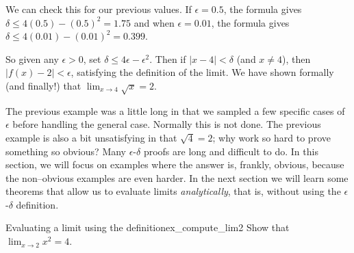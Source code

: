 \begin{solution}
{We can check this for our previous values.  If $\epsilon=0.5$, the formula gives
$\delta \leq 4(0.5) - (0.5)^2 = 1.75$ and when $\epsilon=0.01$, the formula gives $\delta \leq 4(0.01) - (0.01)^2 = 0.399$.

So given any $\epsilon >0$, set $\delta \leq 4\epsilon - \epsilon^2$. Then if $|x-4|<\delta$ (and $x\neq 4$), then $|f(x) - 2| < \epsilon$,  satisfying the definition of the limit.  We have shown formally (and finally!) that $\displaystyle \lim_{x\rightarrow 4} \sqrt{x} = 2 $.
}
\end{solution}




The previous example was a little long in that we sampled a few specific cases of $\epsilon$ before handling the general case. Normally this is not done.  The previous example is also a bit unsatisfying in that $\sqrt{4}=2$; why work so hard to prove something so obvious? Many $\epsilon$-$\delta$ proofs are long and difficult to do. In this section, we will focus on examples where the answer is, frankly, obvious, because the non--obvious examples are even harder. In the next section we will learn some theorems that allow us to evaluate limits \textit{analytically}, that is, without using the $\epsilon$-$\delta$ definition.\\

\begin{example}{Evaluating a limit using the definition}{ex_compute_lim2}{
Show that $\displaystyle \lim_{x\rightarrow 2} x^2 = 4$.}
\end{example}


